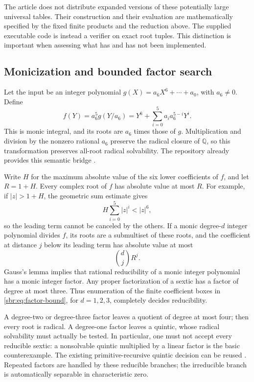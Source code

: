 \documentclass[11pt,letterpaper]{article}
\numberwithin{equation}{section}
\theoremstyle{definition}
\theoremstyle{remark}
\newcommand{\QQ}{\mathbb Q}
\begin{document}
The article does not distribute expanded versions of these potentially
large universal tables. Their construction and their evaluation are
mathematically specified by the fixed finite products and the reduction
above. The supplied executable code is instead a verifier on exact root
tuples. This distinction is important when assessing what has and has not
been implemented.

\subsection{Monicization and bounded factor search}

Let the input be an integer polynomial
$g(X)=a_6X^6+\cdots+a_0$, with $a_6\ne0$. Define
\begin{equation}
 f(Y)=a_6^5g(Y/a_6)
     =Y^6+\sum_{i=0}^5 a_i a_6^{5-i}Y^i.
 \label{sbr:eq:monicization}
\end{equation}
This is monic integral, and its roots are $a_6$ times those of $g$.
Multiplication and division by the nonzero rational $a_6$ preserve the
radical closure of $\QQ$, so this transformation preserves all-root
radical solvability. The repository already provides this semantic bridge
\cite{repo-semantics}.

Write $H$ for the maximum absolute value of the six lower coefficients of
$f$, and let $R=1+H$. Every complex root of $f$ has absolute value at most
$R$. For example, if $|z|>1+H$, the geometric sum estimate gives
\[
 H\sum_{i=0}^5|z|^i<|z|^6,
\]
so the leading term cannot be canceled by the others.
If a monic degree-$d$ integer polynomial divides $f$, its roots are a
submultiset of these roots, and the coefficient at distance $j$ below its
leading term has absolute value at most
\begin{equation}
 \binom dj R^j.\label{sbr:eq:factor-bound}
\end{equation}
Gauss's lemma implies that rational reducibility of a monic integer
polynomial has a monic integer factor. Any proper factorization of a
sextic has a factor of degree at most three. Thus enumeration of the
finite coefficient boxes in \cref{sbr:eq:factor-bound}, for $d=1,2,3$,
completely decides reducibility.

A degree-two or degree-three factor leaves a quotient of degree at most
four; then every root is radical. A degree-one factor leaves a quintic,
whose radical solvability must actually be tested. In particular, one
must not accept every reducible sextic: a nonsolvable quintic multiplied
by a linear factor is the basic counterexample. The existing
primitive-recursive quintic decision can be reused
\cite{repo,repo-reducible}. Repeated factors are handled by these reducible
branches; the irreducible branch is automatically separable in
characteristic zero.
\end{document}
